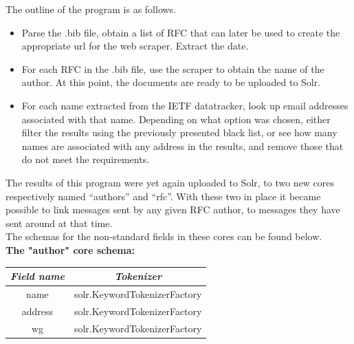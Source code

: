 \documentclass[a4paper,english]{report}
\begin{document}
The outline of the program is as follows.

\begin{itemize}

\item Parse the .bib file, obtain a list of RFC that can later be used to create the appropriate url for the web scraper. Extract the date.
\item For each RFC in the .bib file, use the scraper to obtain the name of the author. At this point, the documents are ready to be uploaded to Solr.


\item For each name extracted from the IETF datatracker, look up email addresses associated with that name. Depending on what option was chosen, either filter the results using the previously presented black list, or see how many names are associated with any address in the results, and remove those that do not meet the requirements.



\end{itemize}


The results of this program were yet again uploaded to Solr, to two new cores respectively named “authors” and “rfc”. With these two in place it became possible to link messages sent by any given RFC author, to messages they have sent around at that time.\\


The schemas for the non-standard fields in these cores can be found below.\\

\textbf{The "author" core schema:}
\begin{center}
 \begin{tabular}{||c | c||} 
 \hline
 \textit{Field name} & \textit{Tokenizer} \\ [1ex] 
 \hline\hline


name & solr.KeywordTokenizerFactory\\

\hline

address & solr.KeywordTokenizerFactory\\

\hline

wg & solr.KeywordTokenizerFactory\\

\hline



\end{tabular}
\end{center}
\end{document}
